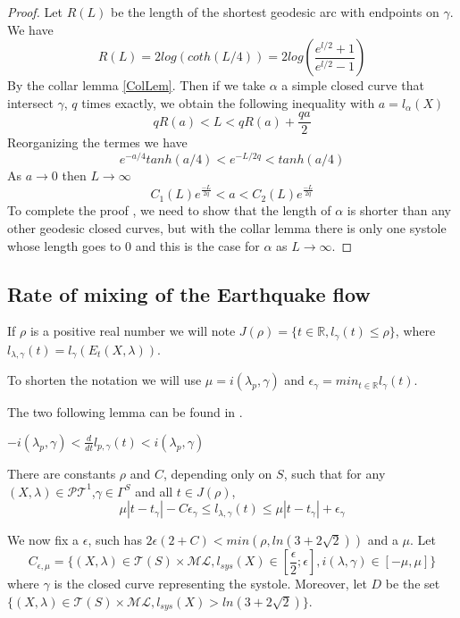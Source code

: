 \begin{proof}
Let $R(L)$ be the length of the shortest geodesic arc with endpoints on $\gamma$. We have \[
R(L)= 2 log(coth(L/4))=2 log(\frac{e^{l/2}+1}{e^{l/2}-1})
\]
By the collar lemma \ref{ColLem}.
Then if we take $\alpha$ a simple closed curve that intersect $\gamma$, $q$ times exactly, we obtain the following inequality with $a=l_\alpha(X)$ \[
q R(a) < L < q R(a) + \frac{qa}{2}
\]
Reorganizing the termes we have \[
e^{-a/4}tanh(a/4) < e^{-L/2q} < tanh(a/4)
\]
As $a \rightarrow 0$ then $L \rightarrow \infty$
\[
C_1(L) e^{\frac{-L}{2q}} < a < C_2(L) e^{\frac{-L}{2q}}
\]
To complete the proof , we need to show that the length of $\alpha$ is shorter than any other geodesic closed curves, but with the collar lemma there is only one systole whose length goes to $0$ and this is the case for $\alpha$ as $L \rightarrow \infty$.

\end{proof}

\subsection{Rate of mixing of the Earthquake flow}

If $\rho$ is a positive real number we will note $J(\rho)= \{t \in \mathbb{R} , l_\gamma(t) \leq \rho \}$, where $l_{\lambda,\gamma}(t)=l_{\gamma}(E_t(X,\lambda))$.

To shorten the notation we will use $\mu=i(\lambda_p,\gamma)$ and $\epsilon_\gamma = min_{t \in \mathbb{R}} l_\gamma (t)$.

The two following lemma can be found in \cite{articleMetW}.

\begin{lem}
$-i(\lambda_p,\gamma) < \frac{d}{dt}l_{p,\gamma}(t) < i(\lambda_p,\gamma)$
\end{lem}

\begin{lem}\label{LemFra}

There are constants $\rho$ and $C$, depending only on $S$, such that for any $(X, \lambda) \in \mathcal{PT}^1$,$\gamma \in \Gamma^S$
and all $t\in J(\rho)$, \[
\mu |t-t_\gamma |-C \epsilon_\gamma \leq l_{\lambda,\gamma}(t) \leq \mu |t- t_\gamma | + \epsilon_\gamma
\]

\end{lem}

We now fix a $\epsilon$, such has $2 \epsilon(2+C) < min( \rho , ln(3+2 \sqrt{2}))$ and a $\mu$. Let \[
C_{\epsilon,\mu}=\{ (X,\lambda) \in \mathcal{T}(S) \times \mathcal{ML},l_{sys}(X) \in  [\frac{\epsilon}{2};\epsilon], i(\lambda,\gamma) \in [-\mu,\mu]  \}
\]
where $\gamma$ is the closed curve representing the systole. Moreover, let $D$ be the set $\{ (X,\lambda) \in \mathcal{T}(S) \times \mathcal{ML},l_{sys}(X) > ln(3+2 \sqrt{2}) \} $.

